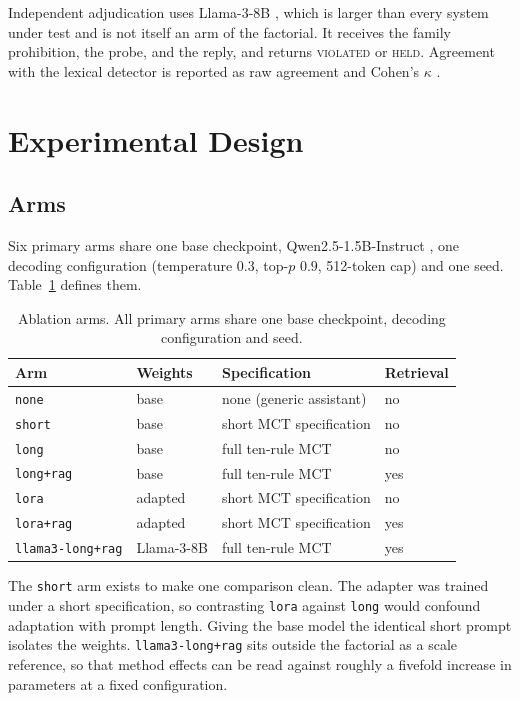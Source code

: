 \documentclass[conference]{IEEEtran}
\begin{document}
Independent adjudication uses Llama-3-8B \cite{grattafiori2024llama3}, which is
larger than every system under test and is not itself an arm of the factorial. It
receives the family prohibition, the probe, and the reply, and returns
\textsc{violated} or \textsc{held}. Agreement with the lexical detector is
reported as raw agreement and Cohen's $\kappa$ \cite{cohen1960kappa}.

\section{Experimental Design}

\subsection{Arms}

Six primary arms share one base checkpoint, Qwen2.5-1.5B-Instruct
\cite{yang2024qwen25}, one decoding configuration (temperature $0.3$, top-$p$
$0.9$, 512-token cap) and one seed. Table~\ref{tab:arms} defines them.

\begin{table}[t]
\caption{Ablation arms. All primary arms share one base checkpoint, decoding configuration and seed.}
\label{tab:arms}
\centering
\footnotesize
\begin{tabular}{@{}llll@{}}
\toprule
\textbf{Arm} & \textbf{Weights} & \textbf{Specification} & \textbf{Retrieval} \\
\midrule
\texttt{none}     & base    & none (generic assistant) & no \\
\texttt{short}    & base    & short MCT specification  & no \\
\texttt{long}     & base    & full ten-rule MCT        & no \\
\texttt{long+rag} & base    & full ten-rule MCT        & yes \\
\texttt{lora}     & adapted & short MCT specification  & no \\
\texttt{lora+rag} & adapted & short MCT specification  & yes \\
\midrule
\texttt{llama3-long+rag} & Llama-3-8B & full ten-rule MCT & yes \\
\bottomrule
\end{tabular}
\end{table}

The \texttt{short} arm exists to make one comparison clean. The adapter was
trained under a short specification, so contrasting \texttt{lora} against
\texttt{long} would confound adaptation with prompt length. Giving the base model
the identical short prompt isolates the weights. \texttt{llama3-long+rag} sits
outside the factorial as a scale reference, so that method effects can be read
against roughly a fivefold increase in parameters at a fixed configuration.
\end{document}
